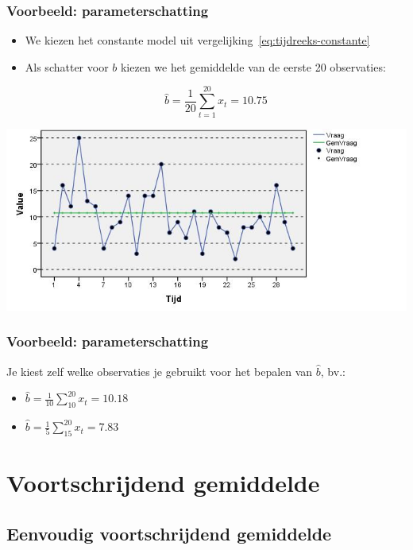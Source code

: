 \documentclass[aspectratio=169]{beamer}
\begin{document}
\begin{frame}
  \frametitle{Voorbeeld: parameterschatting}

  \begin{itemize}
    \item We kiezen het constante model uit vergelijking~\ref{eq:tijdreeks-constante}
    \item Als schatter voor $b$ kiezen we het gemiddelde van de eerste 20 observaties:

      \[ \widehat{b} = \frac{1}{20} \sum_{t = 1}^{20} x_{t}= 10.75 \]

  \end{itemize}

  \centering
  \includegraphics[width=.7\textwidth]{img/tijdreeks21.jpg}
\end{frame}

\begin{frame}
  \frametitle{Voorbeeld: parameterschatting}

  Je kiest zelf welke observaties je gebruikt voor het bepalen van $\widehat{b}$, bv.:

  \begin{itemize}
    \item $\widehat{b} = \frac{1}{10} \sum_{10}^{20} x_{t} = 10.18$
    \item $\widehat{b} = \frac{1}{5} \sum_{15}^{20} x_{t} = 7.83$
  \end{itemize}

\end{frame}

\section{Voortschrijdend gemiddelde}

\subsection{Eenvoudig voortschrijdend gemiddelde}
\end{document}
